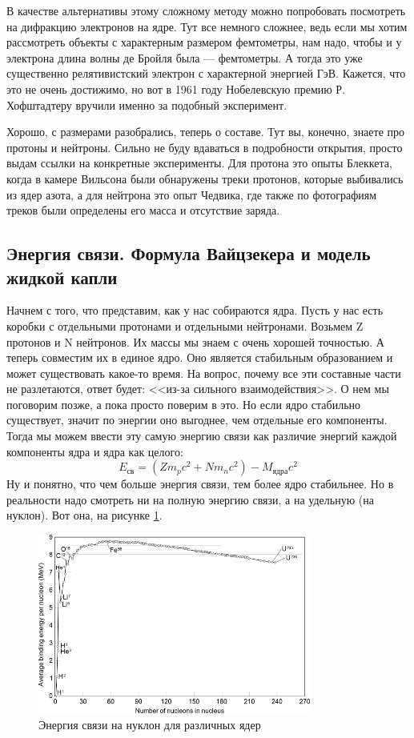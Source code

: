 \documentclass[12pt]{article}
\begin{document}
В качестве альтернативы этому сложному методу можно попробовать посмотреть на дифракцию электронов на ядре. Тут все немного сложнее, ведь если мы хотим рассмотреть объекты с характерным размером фемтометры, нам надо, чтобы и у электрона длина волны де Бройля была --- фемтометры. А тогда это уже существенно релятивистский электрон с характерной энергией ГэВ. Кажется, что это не очень достижимо, но вот в 1961 году Нобелевскую премию Р. Хофштадтеру вручили именно за подобный эксперимент.

Хорошо, с размерами разобрались, теперь о составе. Тут вы, конечно, знаете про протоны и нейтроны. Сильно не буду вдаваться в подробности открытия, просто выдам ссылки на конкретные эксперименты. Для протона это опыты Блеккета, когда в камере Вильсона были обнаружены треки протонов, которые выбивались из ядер азота, а для нейтрона это опыт Чедвика, где также по фотографиям треков были определены его масса и отсутствие заряда.

\subsection{Энергия связи. Формула Вайцзекера и модель жидкой капли}
Начнем с того, что представим, как у нас собираются ядра. Пусть у нас есть коробки с отдельными протонами и отдельными нейтронами. Возьмем Z протонов и N нейтронов. Их массы мы знаем с очень хорошей точностью. А теперь совместим их в единое ядро. Оно является стабильным образованием и может существовать какое-то время. На вопрос, почему все эти составные части не разлетаются, ответ будет: <<из-за сильного взаимодействия>>. О нем мы поговорим позже, а пока просто поверим в это. Но если ядро стабильно существует, значит по энергии оно выгоднее, чем отдельные его компоненты. Тогда мы можем ввести эту самую энергию связи как различие энергий каждой компоненты ядра и ядра как целого:
\begin{equation}
    E_{\text{св}} = (Z m_pc^2 + N m_nc^2) - M_{\text{ядра}}c^2
\end{equation}
Ну и понятно, что чем больше энергия связи, тем более ядро стабильнее. Но в реальности надо смотреть ни на полную энергию связи, а на удельную (на нуклон). Вот она, на рисунке \ref{fig:sem_09_link_energy}.
\begin{figure}[h]
    \centering
    \includegraphics[width=0.8\textwidth,height=\textheight,keepaspectratio]{Seminar_09/pics/pic_binding_energy.png}
    \caption{Энергия связи на нуклон для различных ядер}
    \label{fig:sem_09_link_energy}
\end{figure}
\end{document}
